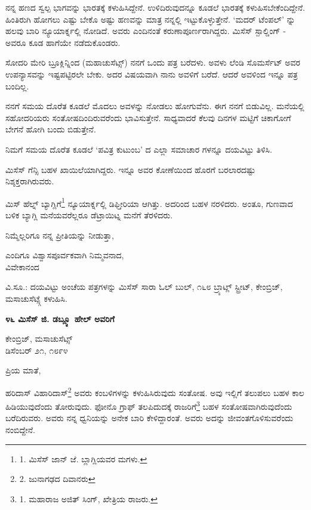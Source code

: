 ನನ್ನ ಹಣದ ಸ್ವಲ್ಪ ಭಾಗವನ್ನು ಭಾರತಕ್ಕೆ ಕಳುಹಿಸಿದ್ದೇನೆ. ಉಳಿದಿರುವುದನ್ನೂ ಕೂಡಲೆ ಭಾರತಕ್ಕೆ ಕಳುಹಿಸಬೇಕೆಂದಿದ್ದೇನೆ. ಹಿಂತಿರುಗಿ ಹೋಗಲು ಎಷ್ಟು ಬೇಕೊ ಅಷ್ಟು ಹಣವನ್ನು ಮಾತ್ರ ನನ್ನಲ್ಲಿ ಇಟ್ಟುಕೊಳ್ಳುತ್ತೇನೆ. ‘ಮದರ್ ಟೆಂಪಲ್’ ನ್ನು ಹಲವು ಬಾರಿ ನ್ಯೂಯಾರ್ಕ್ನಲ್ಲಿ ನೋಡಿದೆ. ಅವರು ಎಂದಿನಂತೆ ಕರುಣಾಪೂರ್ಣರಾಗಿದ್ದರು. ಮಿಸೆಸ್ ಸ್ಪಾಲ್ಡಿಂಗ್ - ಅವರೂ ಕೂಡ ಹಾಗೆಯೇ ನಡೆದುಕೊಂಡರು.

ಸೋದರಿ ಮೇರಿ ಬ್ರೂಕ್ಲಿನ್ನಿಂದ (ಮಹಾಚುಸೆಟ್ಸ್) ನನಗೆ ಒಂದು ಪತ್ರ ಬರೆದಳು. ಅವಳು ಲೆಂಡಿ ಸೊಮರ್ಸೆಟ್ ಅವರ ಉಪನ್ಯಾಸವನ್ನು ಇಷ್ಟಪಟ್ಟಿರಲೇ ಬೇಕು. ಅದರ ವಿಷಯವಾಗಿ ನಾನು ಅವಳಿಗೆ ಬರೆದೆ. ಆದರೆ ಅವಳಿಂದ ಇನ್ನೂ ಪತ್ರ ಬಂದಿಲ್ಲ.

ನನಗೆ ಸಮಯ ದೊರೆತ ಕೂಡಲೆ ಮೊದಲು ಅವಳನ್ನು ನೋಡಲು ಹೋಗುವೆನು. ಈಗ ನನಗೆ ಬಿಡುವಿಲ್ಲ. ಮನೆಯಲ್ಲಿ ಸಹೋದರಿಯರು ಸಂತೋಷದಿಂದಿರುವರೆಂದು ಭಾವಿಸುತ್ತೇನೆ. ಸಾಧ್ಯವಾದರೆ ಕೆಲವು ದಿನಗಳ ಮಟ್ಟಿಗೆ ಚಿಕಾಗೋಗೆ ಬೇಗನೆ ಹೋಗಿ ಬಂದು ಬಿಡುತ್ತೇನೆ.

ನಿಮಗೆ ಸಮಯ ದೊರೆತ ಕೂಡಲೆ ‘ಪವಿತ್ರ ಕುಟುಂಬ’ ದ ಎಲ್ಲಾ ಸಮಾಚಾರ ಗಳನ್ನೂ ದಯವಿಟ್ಟು ತಿಳಿಸಿ.

ಮಿಸೆಸ್ ಗೆನ್ಸಿ ಬಹಳ ಖಾಯಿಲೆಯಾಗಿದ್ದರು. ಇನ್ನೂ ಅವರ ಕೋಣೆಯಿಂದ ಹೊರಗೆ ಬರಲಾರದಷ್ಟು ನಿಶ್ಶಕ್ತರಾಗಿರುವರು.

ಮಿಸ್ ಹೆಲ್ನ್ ಬ್ಯಾಗ್ಲಿಗೆ\footnote{1. ಮಿಸೆಸ್ ಜಾನ್ ಜೆ. ಬ್ಲಾಗ್ಲಿಯವರ ಮಗಳು.} ನ್ಯೂಯಾರ್ಕ್ನಲ್ಲಿ ಡಿಫ್ತೀರಿಯಾ ಆಗಿತ್ತು. ಅದರಿಂದ ಬಹಳ ನರಳಿದರು. ಅಂತೂ, ಗುಣವಾದ ಬಳಿಕ ಬ್ಯಾಗ್ಲಿ ಮನೆಯವರೆಲ್ಲರೂ ಡೆಟ್ರಾಯಿಟ್ನ ಮನೆಗೆ ತೆರಳಿದರು.

ನಿಮ್ಮೆಲ್ಲರಿಗೂ ನನ್ನ ಪ್ರೀತಿಯನ್ನು ನೀಡುತ್ತಾ,

\begin{flushright}
ಎಂದಿಗೂ ವಿಶ್ವಾಸಪೂರ್ವಕವಾಗಿ ನಿಮ್ಮವನಾದ,\\ವಿವೇಕಾನಂದ
\end{flushright}

ವಿ.ಸೂ.: ದಯವಿಟ್ಟು ಅಂಚೆಯ ಪತ್ರಗಳನ್ನು  ಮಿಸೆಸ್ ಸಾರಾ ಓಲ್ ಬುಲ್, ೧೬೮ ಬ್ರ್ಯಾಟ್ಲ್ ಸ್ಟ್ರೀಟ್, ಕೇಂಬ್ರಿಜ್, ಮಸಾಚುಸೆಟ್ಸ್ಗೆ ಕಳುಹಿಸಿ.

\begin{center}
\textbf{೪೬ ಮಿಸೆಸ್ ಜಿ. ಡಬ್ಲ್ಯೂ ಹೇಲ್ ಅವರಿಗೆ}
\end{center}

\begin{flushright}
ಕೇಂಬ್ರಿಜ್, ಮಸಾಚುಸೆಟ್ಸ್\\ಡಿಸೆಂಬರ್ ೨೧, ೧೮೯೪
\end{flushright}

ಪ್ರಿಯ ಮಾತೆ,

ಹರಿದಾಸ್ ವಿಹಾರಿದಾಸ್\footnote{2. ಜುನಾಗಢದ ದಿವಾನರು} ಅವರು ಕಂಬಳಿಗಳನ್ನು ಕಳುಹಿಸಿರುವುದು ಸಂತೋಷ. ಅವು ಇಲ್ಲಿಗೆ ತಲುಪಲು ಬಹಳ ಕಾಲ ಹಿಡಿಯುವುದೆಂದು ತೋರುವುದು. ಫೋನೊ ಗ್ರಾಫ್ ತಲಪಿದುದಕ್ಕೆ ರಾಜರಿಗೆ\footnote{1. ಮಹಾರಾಜ ಅಜಿತ್ ಸಿಂಗ್, ಖೇತ್ರಿಯ ರಾಜರು.} ಬಹಳ ಸಂತೋಷವಾಗಿರುವುದೆಂದು ಬರೆದಿರುವರು. ಅವರು ನನ್ನ ಧ್ವನಿಯನ್ನು ಅನೇಕ ಬಾರಿ ಕೇಳಿದ್ದಾರಂತೆ. ಅವರು ಅದನ್ನು ಜೀವಂತಗೊಳಿಸುವರೆಂದು ನಂಬಿದ್ದೇನೆ.


